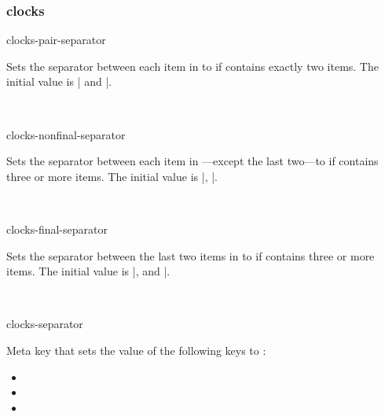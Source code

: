 \documentclass{beerydoc}
\begin{document}
\subsubsection{clocks}
\label{subsubsec:clocks}

\begin{codedoc}{clocks-pair-separator}
  \begin{syntax}
  \end{syntax}
  Sets the separator between each item in  to  if
   contains exactly two items.
  The initial value is | and |.
  \begin{codedemo}
    \\
  \end{codedemo}
\end{codedoc}

\begin{codedoc}{clocks-nonfinal-separator}
  \begin{syntax}
  \end{syntax}
  Sets the separator between each item in ---except the last
  two---to  if  contains three or more items.
  The initial value is |, |.
  \begin{codedemo}
    \\
  \end{codedemo}
\end{codedoc}

\begin{codedoc}{clocks-final-separator}
  \begin{syntax}
  \end{syntax}
  Sets the separator between the last two items in  to
   if  contains three or more items.
  The initial value is |, and |.
  \begin{codedemo}
    \\
  \end{codedemo}
\end{codedoc}

\begin{codedoc}{clocks-separator}
  \begin{syntax}
  \end{syntax}
  Meta key that sets the value of the following keys to :
  \begin{itemize}
    \item {}
    \item {}
    \item {}
  \end{itemize}
\end{codedoc}
\end{document}
